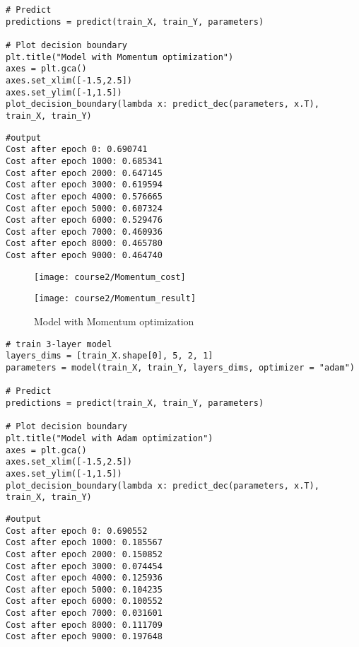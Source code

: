 {\begin{verbatim}
# Predict
predictions = predict(train_X, train_Y, parameters)

# Plot decision boundary
plt.title("Model with Momentum optimization")
axes = plt.gca()
axes.set_xlim([-1.5,2.5])
axes.set_ylim([-1,1.5])
plot_decision_boundary(lambda x: predict_dec(parameters, x.T), train_X, train_Y)
\end{verbatim}


\begin{verbatim}
#output
Cost after epoch 0: 0.690741
Cost after epoch 1000: 0.685341
Cost after epoch 2000: 0.647145
Cost after epoch 3000: 0.619594
Cost after epoch 4000: 0.576665
Cost after epoch 5000: 0.607324
Cost after epoch 6000: 0.529476
Cost after epoch 7000: 0.460936
Cost after epoch 8000: 0.465780
Cost after epoch 9000: 0.464740
\end{verbatim}

\begin{figure}[h]
\begin{center}
\texttt{[image: course2/Momentum\_cost]}
\end{center}
\end{figure}

\begin{figure}[h]
\begin{center}
\texttt{[image: course2/Momentum\_result]}
\caption{Model with Momentum optimization}
\end{center}
\end{figure}


\begin{verbatim}
# train 3-layer model
layers_dims = [train_X.shape[0], 5, 2, 1]
parameters = model(train_X, train_Y, layers_dims, optimizer = "adam")

# Predict
predictions = predict(train_X, train_Y, parameters)

# Plot decision boundary
plt.title("Model with Adam optimization")
axes = plt.gca()
axes.set_xlim([-1.5,2.5])
axes.set_ylim([-1,1.5])
plot_decision_boundary(lambda x: predict_dec(parameters, x.T), train_X, train_Y)
\end{verbatim}

\begin{verbatim}
#output
Cost after epoch 0: 0.690552
Cost after epoch 1000: 0.185567
Cost after epoch 2000: 0.150852
Cost after epoch 3000: 0.074454
Cost after epoch 4000: 0.125936
Cost after epoch 5000: 0.104235
Cost after epoch 6000: 0.100552
Cost after epoch 7000: 0.031601
Cost after epoch 8000: 0.111709
Cost after epoch 9000: 0.197648
\end{verbatim}

}
